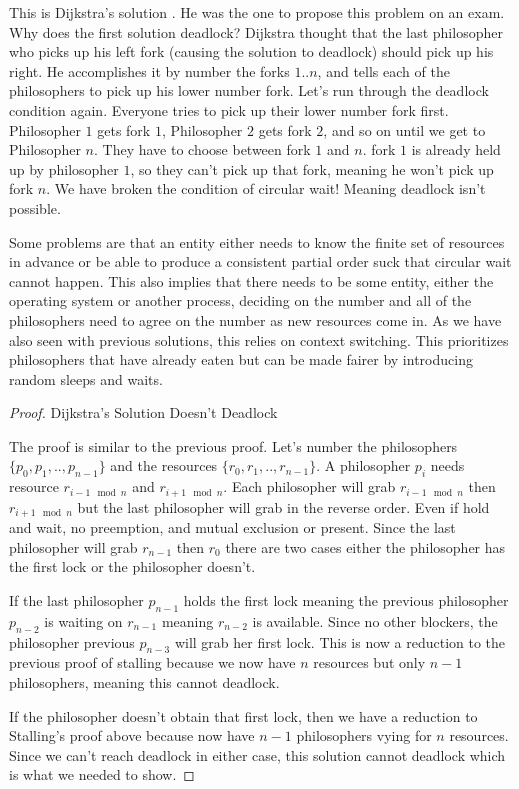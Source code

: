 This is Dijkstra's solution \cite[P. 20]{EWD:EWD310}. He was the one to propose this problem on an exam.
Why does the first solution deadlock? Dijkstra thought that the last philosopher who picks up his left fork (causing the solution to deadlock) should pick up his right.
He accomplishes it by number the forks $1..n$, and tells each of the philosophers to pick up his lower number fork.
Let's run through the deadlock condition again.
Everyone tries to pick up their lower number fork first.
Philosopher $1$ gets fork $1$, Philosopher $2$ gets fork $2$, and so on until we get to Philosopher $n$.
They have to choose between fork $1$ and $n$.
fork $1$ is already held up by philosopher $1$, so they can't pick up that fork, meaning he won't pick up fork $n$.
We have broken the condition of circular wait! Meaning deadlock isn't possible.

Some problems are that an entity either needs to know the finite set of resources in advance or be able to produce a consistent partial order suck that circular wait cannot happen.
This also implies that there needs to be some entity, either the operating system or another process, deciding on the number and all of the philosophers need to agree on the number as new resources come in.
As we have also seen with previous solutions, this relies on context switching.
This prioritizes philosophers that have already eaten but can be made fairer by introducing random sleeps and waits.

\begin{proof} Dijkstra's Solution Doesn't Deadlock

The proof is similar to the previous proof.
Let's number the philosophers $\{p_0, p_1, .., p_{n-1}\}$ and the resources $\{r_0, r_1, .., r_{n-1}\}$.
A philosopher $p_i$ needs resource $r_{i-1 \mod n}$ and $r_{i + 1 \mod n}$.
Each philosopher will grab $r_{i-1 \mod n}$ then $r_{i + 1 \mod n}$ but the last philosopher will grab in the reverse order.
Even if hold and wait, no preemption, and mutual exclusion or present.
Since the last philosopher will grab $r_{n-1}$ then $r_0$ there are two cases either the philosopher has the first lock or the philosopher doesn't.

If the last philosopher $p_{n-1}$ holds the first lock meaning the previous philosopher $p_{n-2}$ is waiting on $r_{n-1}$ meaning $r_{n-2}$ is available.
Since no other blockers, the philosopher previous $p_{n-3}$ will grab her first lock.
This is now a reduction to the previous proof of stalling because we now have $n$ resources but only $n-1$ philosophers, meaning this cannot deadlock.

If the philosopher doesn't obtain that first lock, then we have a reduction to Stalling's proof above because now have $n-1$ philosophers vying for $n$ resources.
Since we can't reach deadlock in either case, this solution cannot deadlock which is what we needed to show.

\end{proof}

